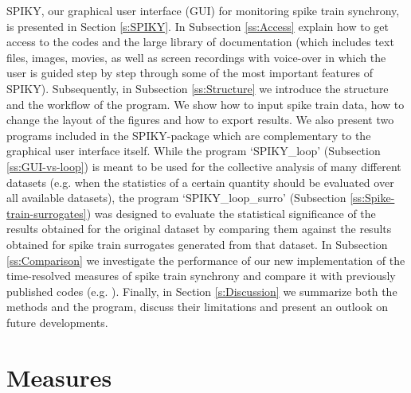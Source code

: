 \documentclass[10pt,twocolumn]{elsart5p}
\begin{document}
SPIKY, our graphical user interface (GUI) for monitoring spike train synchrony, is presented in Section \ref{s:SPIKY}. In Subsection \ref{ss:Access} explain how to get access to the codes and the large library of documentation (which includes text files, images, movies, as well as screen recordings with voice-over in which the user is guided step by step through some of the most important features of SPIKY). Subsequently, in Subsection \ref{ss:Structure} we introduce the structure and the workflow of the program. We show how to input spike train data, how to change the layout of the figures and how to export results. We also present two programs included in the SPIKY-package which are complementary to the graphical user interface itself. While the program `SPIKY\_loop' (Subsection \ref{ss:GUI-vs-loop}) is meant to be used for the collective analysis of many different datasets (e.g. when the statistics of a certain quantity should be evaluated over all available datasets), the program `SPIKY\_loop\_surro' (Subsection \ref{ss:Spike-train-surrogates}) was designed to evaluate the statistical significance of the results obtained for the original dataset by comparing them against the results obtained for spike train surrogates generated from that dataset. In Subsection \ref{ss:Comparison} we investigate the performance of our new implementation of the time-resolved measures of spike train synchrony and compare it with previously published codes (e.g. \citet{Rusu14}). Finally, in Section \ref{s:Discussion} we summarize both the methods and the program, discuss their limitations and present an outlook on future developments.

%
%
%
%
\section{\label{s:Measures} Measures}
\end{document}
